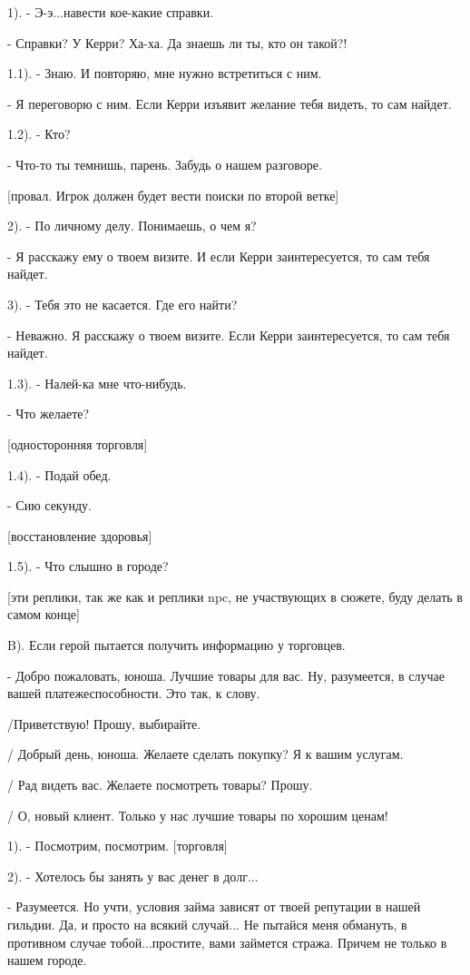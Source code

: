 \documentclass[12pt,a4paper]{book}
\begin{document}
1). - Э-э...навести кое-какие справки.

- Справки? У Керри? Ха-ха. Да знаешь ли ты, кто он такой?!

1.1). - Знаю. И повторяю, мне нужно встретиться с ним.

- Я переговорю с ним. Если Керри изъявит желание тебя видеть, то сам найдет.

1.2). - Кто?

- Что-то ты темнишь, парень. Забудь о нашем разговоре.

[провал. Игрок должен будет вести поиски по второй ветке] 

2). - По личному делу. Понимаешь, о чем я?

- Я расскажу ему о твоем визите. И если Керри заинтересуется, то сам тебя найдет. 

3). - Тебя это не касается. Где его найти?

- Неважно. Я расскажу о твоем визите. Если Керри заинтересуется, то сам тебя найдет.  

1.3). - Налей-ка мне что-нибудь.

- Что желаете?

[односторонняя торговля]

1.4). - Подай обед.

- Сию секунду.

[восстановление здоровья]

1.5). - Что слышно в городе?

[эти реплики, так же как и реплики npc, не участвующих в сюжете, буду делать в самом конце]

B). Если герой пытается получить информацию у торговцев.

- Добро пожаловать, юноша. Лучшие товары для вас. Ну, разумеется, в случае вашей платежеспособности. Это так, к слову.

/Приветствую! Прошу, выбирайте.

/ Добрый день, юноша. Желаете сделать покупку? Я к вашим услугам.

/ Рад видеть вас. Желаете посмотреть товары? Прошу.

/ О, новый клиент. Только у нас лучшие товары по хорошим ценам!

1). - Посмотрим, посмотрим. [торговля]

2). - Хотелось бы занять у вас денег в долг...

- Разумеется. Но учти, условия займа зависят от твоей репутации в нашей гильдии. Да, и просто на всякий случай... Не пытайся меня обмануть, в противном случае тобой...простите, вами займется стража. Причем не только в нашем городе.
\end{document}
